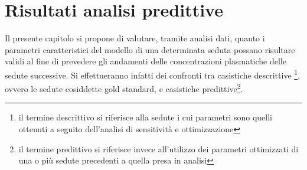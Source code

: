 \documentclass[10pt,twoside]{book}
\begin{document}
\chapter{Risultati analisi predittive}
 Il presente capitolo si propone di valutare, tramite analisi dati, quanto i parametri caratteristici del modello di una determinata seduta possano risultare validi al fine di prevedere gli andamenti delle concentrazioni plasmatiche delle sedute successive.
 Si effettueranno infatti dei confronti tra casistiche descrittive \footnote{il termine descrittivo si riferisce alla sedute i cui parametri sono quelli ottenuti a seguito dell'analisi di sensitività e ottimizzazione}, ovvero le sedute cosiddette gold standard, e casistiche predittive\footnote{il termine predittivo si riferisce invece all'utilizzo dei parametri ottimizzati di una o più sedute precedenti a quella presa in analisi}.
\end{document}
